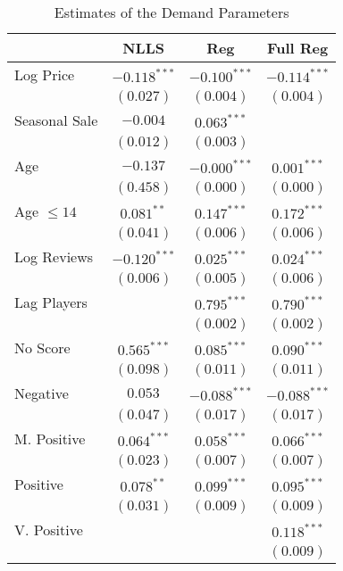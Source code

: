 \documentclass[12pt,pagebackref]{article}
\begin{document}
\begin{table}
\caption{Estimates of the Demand Parameters}
\begin{center}
\begin{tabular}{l c c c}
\hline
 & NLLS & Reg & Full Reg \\
\hline
Log Price     & $-0.118^{***}$ & $-0.100^{***}$ & $-0.114^{***}$ \\
              & $(0.027)$      & $(0.004)$      & $(0.004)$      \\
Seasonal Sale & $-0.004$       & $0.063^{***}$  &                \\
              & $(0.012)$      & $(0.003)$      &                \\
Age           & $-0.137$       & $-0.000^{***}$ & $0.001^{***}$  \\
              & $(0.458)$      & $(0.000)$      & $(0.000)$      \\
Age $\le 14$  & $0.081^{**}$   & $0.147^{***}$  & $0.172^{***}$  \\
              & $(0.041)$      & $(0.006)$      & $(0.006)$      \\
Log Reviews   & $-0.120^{***}$ & $0.025^{***}$  & $0.024^{***}$  \\
              & $(0.006)$      & $(0.005)$      & $(0.006)$      \\
Lag Players   &                & $0.795^{***}$  & $0.790^{***}$  \\
              &                & $(0.002)$      & $(0.002)$      \\
No Score      & $0.565^{***}$  & $0.085^{***}$  & $0.090^{***}$  \\
              & $(0.098)$      & $(0.011)$      & $(0.011)$      \\
Negative      & $0.053$        & $-0.088^{***}$ & $-0.088^{***}$ \\
              & $(0.047)$      & $(0.017)$      & $(0.017)$      \\
M. Positive   & $0.064^{***}$  & $0.058^{***}$  & $0.066^{***}$  \\
              & $(0.023)$      & $(0.007)$      & $(0.007)$      \\
Positive      & $0.078^{**}$   & $0.099^{***}$  & $0.095^{***}$  \\
              & $(0.031)$      & $(0.009)$      & $(0.009)$      \\
V. Positive   &                &                & $0.118^{***}$  \\
              &                &                & $(0.009)$      \\

\end{tabular}
\end{center}
\end{table}
\end{document}
